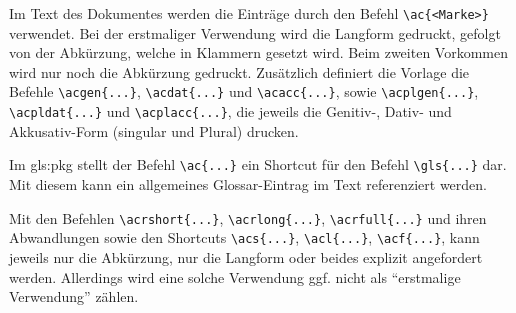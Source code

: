 \begin{latex}[caption={Definition einer Abkürzung mit Zusatzangaben},label={lst:AdvancedAcronymEntry}]
\end{latex}

Im Text des Dokumentes werden die Einträge durch den Befehl \lstinline|\ac{<Marke>}| verwendet.
Bei der erstmaliger Verwendung wird die Langform gedruckt, gefolgt von der Abkürzung, welche in Klammern gesetzt wird.
Beim zweiten Vorkommen wird nur noch die Abkürzung gedruckt.
Zusätzlich definiert die Vorlage die Befehle
\lstinline|\acgen{...}|, \lstinline|\acdat{...}| und \lstinline|\acacc{...}|, sowie
\lstinline|\acplgen{...}|, \lstinline|\acpldat{...}| und \lstinline|\acplacc{...}|,
die jeweils die Genitiv-, Dativ- und Akkusativ-Form (singular und Plural) drucken.

Im \gls{gls:pkg}  stellt der Befehl \lstinline|\ac{...}| ein Shortcut für den Befehl \lstinline|\gls{...}| dar.
Mit diesem kann ein allgemeines Glossar-Eintrag im Text referenziert werden.

Mit den Befehlen
\lstinline|\acrshort{...}|, \lstinline|\acrlong{...}|, \lstinline|\acrfull{...}|
und ihren Abwandlungen sowie den Shortcuts
\lstinline|\acs{...}|, \lstinline|\acl{...}|, \lstinline|\acf{...}|,
kann jeweils nur die Abkürzung, nur die Langform oder beides explizit angefordert werden.
Allerdings wird eine solche Verwendung ggf. nicht als \enquote{erstmalige Verwendung} zählen.

